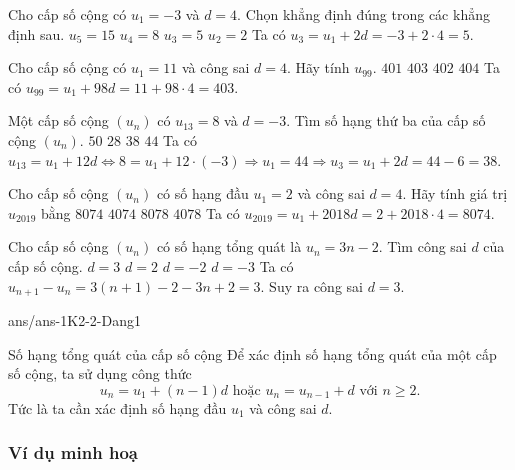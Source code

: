 \begin{ex}%
Cho cấp số cộng có $ u_1=-3 $ và $ d=4 $. Chọn khẳng định đúng trong các khẳng định sau.
\choice
{$ u_5=15 $}
{$ u_4=8 $}
{\True $ u_3=5 $}
{$ u_2=2 $}
\loigiai
{
	Ta có $ u_3=u_1+2d=-3+2\cdot4=5 $.
}
\end{ex}
\begin{ex}%
Cho cấp số cộng có $ u_1=11 $ và công sai $ d=4 $. Hãy tính $ u_{99} $.
\choice
{$ 401 $}
{\True $ 403 $}
{$ 402 $}
{$ 404 $}
\loigiai
{
	Ta có $ u_{99}=u_1+98d=11+98\cdot4=403 $.
}
\end{ex}
\begin{ex}%
Một cấp số cộng $ (u_n) $ có $ u_{13}=8 $ và $ d=-3 $. Tìm số hạng thứ ba của cấp số cộng $ (u_n) $.
\choice
{$ 50 $}
{$ 28 $}
{\True $ 38 $}
{$ 44 $}
\loigiai
{
	Ta có $ u_{13}=u_1+12d \Leftrightarrow 8=u_1+12\cdot(-3)\Rightarrow u_1=44 \Rightarrow u_{3}=u_1+2d=44-6=38$.
}
\end{ex}
\begin{ex}%
Cho cấp số cộng $(u_n) $ có số hạng đầu $ u_1=2 $ và công sai $ d=4 $. Hãy tính giá trị $ u_{2019} $ bằng
\choice
{\True $ 8074 $}
{$ 4074 $}
{$ 8078 $}
{$ 4078 $}
\loigiai
{
	Ta có $ u_{2019}=u_1+2018d=2+2018\cdot 4=8074 $.
}
\end{ex}
\begin{ex}%
Cho cấp số cộng $ (u_n) $ có số hạng tổng quát là $ u_n=3n-2 $. Tìm công sai $ d $ của cấp số cộng.
\choice
{\True $ d=3 $}
{$ d=2 $}
{$ d=-2 $}
{$ d=-3 $}
\loigiai
{
	Ta có $ u_{n+1}-u_n=3(n+1)-2-3n+2=3 $. Suy ra công sai $ d=3 $.
}
\end{ex}
\begin{indapan}{10}
{ans/ans-1K2-2-Dang1}
\end{indapan}
\begin{dang}
	{Số hạng tổng quát của cấp số cộng}
	Để xác định số hạng tổng quát của một cấp số cộng, ta sử dụng công thức
	\[
	u_n= u_1+(n-1)d \text{ hoặc } u_n= u_{n-1}+d \text{ với } n\ge 2.
	\]
	Tức là ta cần xác định số hạng đầu $u_1$ và công sai $d$.
\end{dang}

\subsubsection{Ví dụ minh hoạ}

